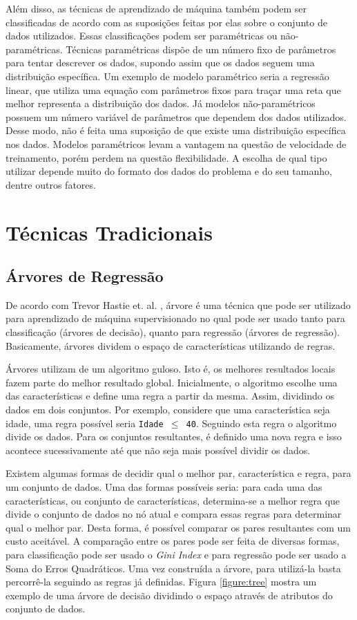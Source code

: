 Além disso, as técnicas de aprendizado de máquina também podem ser classificadas de acordo com as suposições feitas por elas sobre o conjunto de dados utilizados. Essas classificações podem ser paramétricas ou não-paramétricas. Técnicas paramétricas dispõe de um número fixo de parâmetros para tentar descrever os dados, supondo assim que os dados seguem uma distribuição específica. Um exemplo de modelo paramétrico seria a regressão linear, que utiliza uma equação com parâmetros fixos para traçar uma reta que melhor representa a distribuição dos dados. Já modelos não-paramétricos possuem um número variável de parâmetros que dependem dos dados utilizados. Desse modo, não é feita uma suposição de que existe uma distribuição específica nos dados. Modelos paramétricos levam a vantagem na questão de velocidade de treinamento, porém perdem na questão flexibilidade. A escolha de qual tipo utilizar depende muito do formato dos dados do problema e do seu tamanho, dentre outros fatores.

\section{Técnicas Tradicionais}

\subsection{Árvores de Regressão}

De acordo com Trevor Hastie et. al. \cite{hastie2005elements}, árvore é uma técnica que pode ser utilizado para aprendizado de máquina supervisionado no qual pode ser usado tanto para classificação (árvores de decisão), quanto para regressão (árvores de regressão). Basicamente, árvores dividem o espaço de características utilizando de regras.

Árvores utilizam de um algoritmo guloso. Isto é, os melhores resultados locais fazem parte do melhor resultado global. Inicialmente, o algoritmo escolhe uma das características e define uma regra a partir da mesma. Assim, dividindo os dados em dois conjuntos. Por exemplo, considere que uma característica seja idade, uma regra possível seria \texttt{Idade \(\leq\) 40}. Seguindo esta regra o algoritmo divide os dados. Para os conjuntos resultantes, é definido uma nova regra e isso acontece sucessivamente até que não seja mais possível dividir os dados.

Existem algumas formas de decidir qual o melhor par, característica e regra, para um conjunto de dados. Uma das formas possíveis seria: para cada uma das características, ou conjunto de características, determina-se a melhor regra que divide o conjunto de dados no nó atual e compara essas regras para determinar qual o melhor par. Desta forma, é possível comparar os pares resultantes com um custo aceitável. A comparação entre os pares pode ser feita de diversas formas, para classificação pode ser usado o \textit{Gini Index} e para regressão pode ser usado a Soma do Erros Quadráticos. Uma vez construída a árvore, para utilizá-la basta percorrê-la seguindo as regras já definidas. Figura \ref{figure:tree} mostra um exemplo de uma árvore de decisão dividindo o espaço através de atributos do conjunto de dados.

